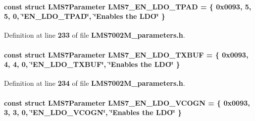 \paragraph[{L\+M\+S7\+\_\+\+E\+N\+\_\+\+L\+D\+O\+\_\+\+T\+P\+AD}]{\setlength{\rightskip}{0pt plus 5cm}const struct {\bf L\+M\+S7\+Parameter} L\+M\+S7\+\_\+\+E\+N\+\_\+\+L\+D\+O\+\_\+\+T\+P\+AD = \{ 0x0093, 5, 5, 0, \char`\"{}\+E\+N\+\_\+\+L\+D\+O\+\_\+\+T\+P\+A\+D\char`\"{}, \char`\"{}\+Enables the L\+D\+O\char`\"{} \}\hspace{0.3cm}{\ttfamily [static]}}\label{LMS7002M__parameters_8h_a0183b9d77d78cfcbc214aca0e60e2e9e}


Definition at line {\bf 233} of file {\bf L\+M\+S7002\+M\+\_\+parameters.\+h}.

\paragraph[{L\+M\+S7\+\_\+\+E\+N\+\_\+\+L\+D\+O\+\_\+\+T\+X\+B\+UF}]{\setlength{\rightskip}{0pt plus 5cm}const struct {\bf L\+M\+S7\+Parameter} L\+M\+S7\+\_\+\+E\+N\+\_\+\+L\+D\+O\+\_\+\+T\+X\+B\+UF = \{ 0x0093, 4, 4, 0, \char`\"{}\+E\+N\+\_\+\+L\+D\+O\+\_\+\+T\+X\+B\+U\+F\char`\"{}, \char`\"{}\+Enables the L\+D\+O\char`\"{} \}\hspace{0.3cm}{\ttfamily [static]}}\label{LMS7002M__parameters_8h_a4bdb91fef28c1990f86a06270260e0ef}


Definition at line {\bf 234} of file {\bf L\+M\+S7002\+M\+\_\+parameters.\+h}.

\paragraph[{L\+M\+S7\+\_\+\+E\+N\+\_\+\+L\+D\+O\+\_\+\+V\+C\+O\+GN}]{\setlength{\rightskip}{0pt plus 5cm}const struct {\bf L\+M\+S7\+Parameter} L\+M\+S7\+\_\+\+E\+N\+\_\+\+L\+D\+O\+\_\+\+V\+C\+O\+GN = \{ 0x0093, 3, 3, 0, \char`\"{}\+E\+N\+\_\+\+L\+D\+O\+\_\+\+V\+C\+O\+G\+N\char`\"{}, \char`\"{}\+Enables the L\+D\+O\char`\"{} \}\hspace{0.3cm}{\ttfamily [static]}}\label{LMS7002M__parameters_8h_a02add19797739c62ae0be999799f5118}


